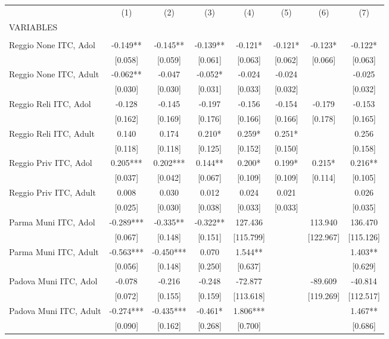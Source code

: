 \begin{tabular}{lccccccc} \hline
 & (1) & (2) & (3) & (4) & (5) & (6) & (7) \\
VARIABLES &  &  &  &  &  &  &  \\ \hline
 &  &  &  &  &  &  &  \\
Reggio None ITC, Adol & -0.149** & -0.145** & -0.139** & -0.121* & -0.121* & -0.123* & -0.122* \\
 & [0.058] & [0.059] & [0.061] & [0.063] & [0.062] & [0.066] & [0.063] \\
Reggio None ITC, Adult & -0.062** & -0.047 & -0.052* & -0.024 & -0.024 &  & -0.025 \\
 & [0.030] & [0.030] & [0.031] & [0.033] & [0.032] &  & [0.032] \\
Reggio Reli ITC, Adol & -0.128 & -0.145 & -0.197 & -0.156 & -0.154 & -0.179 & -0.153 \\
 & [0.162] & [0.169] & [0.176] & [0.166] & [0.166] & [0.178] & [0.165] \\
Reggio Reli ITC, Adult & 0.140 & 0.174 & 0.210* & 0.259* & 0.251* &  & 0.256 \\
 & [0.118] & [0.118] & [0.125] & [0.152] & [0.150] &  & [0.158] \\
Reggio Priv ITC, Adol & 0.205*** & 0.202*** & 0.144** & 0.200* & 0.199* & 0.215* & 0.216** \\
 & [0.037] & [0.042] & [0.067] & [0.109] & [0.109] & [0.114] & [0.105] \\
Reggio Priv ITC, Adult & 0.008 & 0.030 & 0.012 & 0.024 & 0.021 &  & 0.026 \\
 & [0.025] & [0.030] & [0.038] & [0.033] & [0.033] &  & [0.035] \\
Parma Muni ITC, Adol & -0.289*** & -0.335** & -0.322** & 127.436 &  & 113.940 & 136.470 \\
 & [0.067] & [0.148] & [0.151] & [115.799] &  & [122.967] & [115.126] \\
Parma Muni ITC, Adult & -0.563*** & -0.450*** & 0.070 & 1.544** &  &  & 1.403** \\
 & [0.056] & [0.148] & [0.250] & [0.637] &  &  & [0.629] \\
Padova Muni ITC, Adol & -0.078 & -0.216 & -0.248 & -72.877 &  & -89.609 & -40.814 \\
 & [0.072] & [0.155] & [0.159] & [113.618] &  & [119.269] & [112.517] \\
Padova Muni ITC, Adult & -0.274*** & -0.435*** & -0.461* & 1.806*** &  &  & 1.467** \\
 & [0.090] & [0.162] & [0.268] & [0.700] &  &  & [0.686] \\

\end{tabular}
